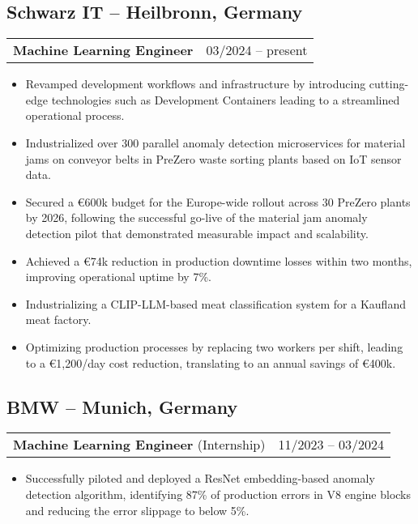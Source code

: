 \documentclass[letterpaper,11pt]{article}
\makeatletter
\newcommand{\resumeItem}[1]{
  \item\small{
    {#1 \vspace{-2pt}}
  }
}
\newcommand{\resumeProjectHeading}[2]{
    \item
    \begin{tabular*}{0.97\textwidth}{l@{\extracolsep{\fill}}r}
      \small#1 & #2 \\
    \end{tabular*}\vspace{-7pt}
}
\newcommand{\resumeItemListStart}{\begin{itemize}[leftmargin=0.2in]}
\newcommand{\resumeItemListEnd}{\end{itemize}\vspace{-5pt}}
\makeatother
\begin{document}
\subsection{\textbf{Schwarz IT} -- Heilbronn, Germany}{\vspace{2px}}
\resumeProjectHeading
{\textbf{Machine Learning Engineer}}{03/2024 -- present}
\resumeItemListStart
\resumeItem{Revamped development workflows and infrastructure by introducing cutting-edge technologies such as Development Containers leading to a streamlined operational process.}
\resumeItem{Industrialized over 300 parallel anomaly detection microservices for material jams on conveyor belts in PreZero waste sorting plants based on IoT sensor data.}
\resumeItem{Secured a €600k budget for the Europe-wide rollout across 30 PreZero plants by 2026, following the successful go-live of the material jam anomaly detection pilot that demonstrated measurable impact and scalability.}
\resumeItem{Achieved a €74k reduction in production downtime losses within two months, improving operational uptime by 7\%.}
\resumeItem{Industrializing a CLIP-LLM-based meat classification system for a Kaufland meat factory.}
\resumeItem{Optimizing production processes by replacing two workers per shift, leading to a €1,200/day cost reduction, translating to an annual savings of €400k.}
\resumeItemListEnd


\subsection{\textbf{BMW} -- Munich, Germany}{\vspace{-5px}}
\resumeProjectHeading
{\textbf{Machine Learning Engineer} (Internship)}{11/2023 -- 03/2024}
\resumeItemListStart
\resumeItem{Successfully piloted and deployed a ResNet embedding-based anomaly detection algorithm, identifying 87\% of production errors in V8 engine blocks and reducing the error slippage to below 5\%.}
\resumeItemListEnd
\end{document}
